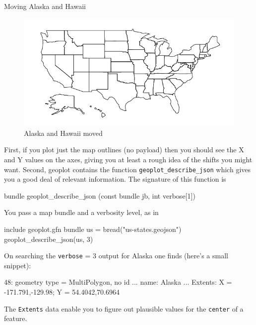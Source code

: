 \documentclass{article}
\begin{document}
\begin{script}[p]
  \caption{Moving Alaska and Hawaii}
  \label{tab:translate}
\end{script}

\begin{figure}[p]
  \centering
  \includegraphics{usmod.pdf}
  \caption{Alaska and Hawaii moved}
  \label{fig:usmod}
\end{figure}

First, if you plot just the map outlines (no payload) then you should
see the X and Y values on the axes, giving you at least a rough idea
of the shifts you might want. Second, \textsf{geoplot} contains the
function \texttt{geoplot\_describe\_json} which gives you a good deal
of relevant information. The signature of this function is
\begin{code}
bundle geoplot_describe_json (const bundle jb, int verbose[1])
\end{code}
You pass a map bundle and a verbosity level, as in
\begin{code}
include geoplot.gfn
bundle us = bread("us-states.geojson")
geoplot_describe_json(us, 3)
\end{code}
On searching the \texttt{verbose} = 3 output for Alaska one finds
(here's a small snippet):
\begin{code}
  48: geometry type = MultiPolygon, no id
        ...
        name: Alaska
        ...
        Extents: X = {-171.791,-129.98}; Y = {54.4042,70.6964}
\end{code}
The \texttt{Extents} data enable you to figure out plausible
values for the \texttt{center} of a feature.
\end{document}

